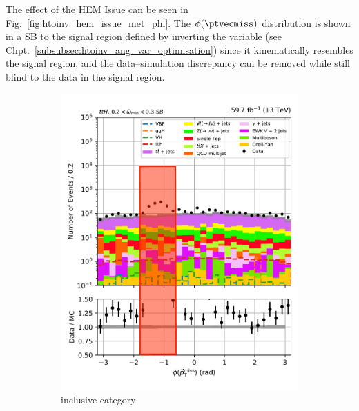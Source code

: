 The effect of the HEM Issue can be seen in Fig.~\ref{fig:htoinv_hem_issue_met_phi}. The $\phi(\ptvecmiss)$ distribution is shown in a \gls{SB} to the signal region defined by inverting the \omegaTilde variable (see Chpt.~\ref{subsubsec:htoinv_ang_var_optimisation}) since it kinematically resembles the signal region, and the data--simulation discrepancy can be removed while still blind to the data in the signal region.

\begin{figure}[htbp]
    \centering
    \begin{subfigure}[b]{0.4\textwidth}
        \includegraphics[width=\textwidth]{figures/hem_issue/sideband_4/met_phi/met_phi_ttH_before_annotated.pdf}
        \caption{\ttH inclusive category}
    \end{subfigure}
    \hspace{0.1\textwidth}
    \begin{subfigure}[b]{0.4\textwidth}

\end{subfigure}
\end{figure}

